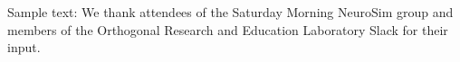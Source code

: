 \documentclass{sigchi}
\begin{document}
Sample text: We thank attendees of the Saturday Morning NeuroSim group and members of the Orthogonal Research and Education Laboratory Slack for their input.

%
%
%
%
%
\balance{}


\balance{}



\end{document}
